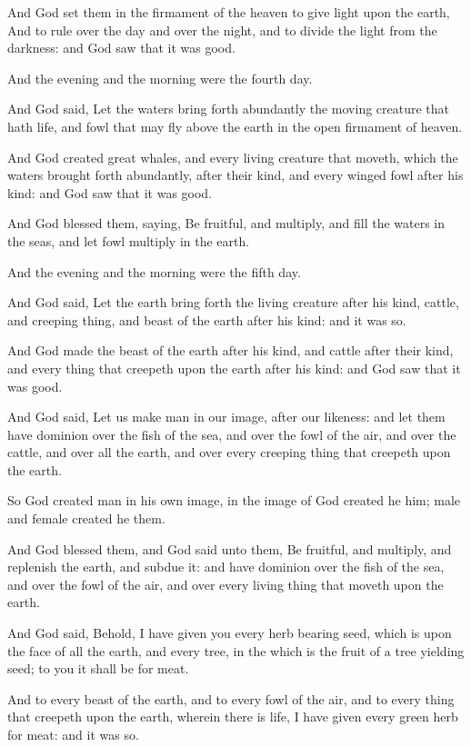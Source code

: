 \verse And God set them in the firmament of the heaven to give light
upon the earth, \verse And to rule over the day and over the night, and
to divide the light from the darkness: and God saw that it was good.

\verse And the evening and the morning were the fourth day.

\verse And God said, Let the waters bring forth abundantly the moving
creature that hath life, and fowl that may fly above the earth in the
open firmament of heaven.

\verse And God created great whales, and every living creature that
moveth, which the waters brought forth abundantly, after their kind,
and every winged fowl after his kind: and God saw that it was good.

\verse And God blessed them, saying, Be fruitful, and multiply, and fill
the waters in the seas, and let fowl multiply in the earth.

\verse And the evening and the morning were the fifth day.

\verse And God said, Let the earth bring forth the living creature after
his kind, cattle, and creeping thing, and beast of the earth after his
kind: and it was so.

\verse And God made the beast of the earth after his kind, and cattle
after their kind, and every thing that creepeth upon the earth after
his kind: and God saw that it was good.

\verse And God said, Let us make man in our image, after our likeness:
and let them have dominion over the fish of the sea, and over the fowl
of the air, and over the cattle, and over all the earth, and over
every creeping thing that creepeth upon the earth.

\verse So God created man in his own image, in the image of God created
he him; male and female created he them.

\verse And God blessed them, and God said unto them, Be fruitful, and
multiply, and replenish the earth, and subdue it: and have dominion
over the fish of the sea, and over the fowl of the air, and over every
living thing that moveth upon the earth.

\verse And God said, Behold, I have given you every herb bearing seed,
which is upon the face of all the earth, and every tree, in the which
is the fruit of a tree yielding seed; to you it shall be for meat.

\verse And to every beast of the earth, and to every fowl of the air,
and to every thing that creepeth upon the earth, wherein there is
life, I have given every green herb for meat: and it was so.

